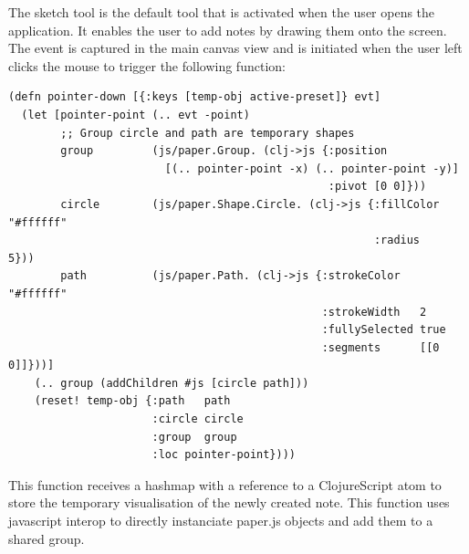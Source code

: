 \documentclass[12pt]{report}
\begin{document}
The sketch tool is the default tool that is activated when the user opens the
application. It enables the user to add notes by drawing them onto the screen.
The event is captured in the main canvas view and is initiated when the
user left clicks the mouse to trigger the following function:

\begin{footnotesize}
\begin{verbatim}
(defn pointer-down [{:keys [temp-obj active-preset]} evt]
  (let [pointer-point (.. evt -point)
        ;; Group circle and path are temporary shapes
        group         (js/paper.Group. (clj->js {:position 
                        [(.. pointer-point -x) (.. pointer-point -y)]
                                                 :pivot [0 0]}))
        circle        (js/paper.Shape.Circle. (clj->js {:fillColor "#ffffff"
                                                        :radius    5}))
        path          (js/paper.Path. (clj->js {:strokeColor   "#ffffff"
                                                :strokeWidth   2
                                                :fullySelected true
                                                :segments      [[0 0]]}))]
    (.. group (addChildren #js [circle path]))
    (reset! temp-obj {:path   path
                      :circle circle
                      :group  group
                      :loc pointer-point})))
\end{verbatim}
\end{footnotesize}

This function receives a hashmap with a reference to a ClojureScript atom to
store the temporary visualisation of the newly created note. This function uses
javascript interop to directly instanciate paper.js objects and add them to a
shared group.
\end{document}
